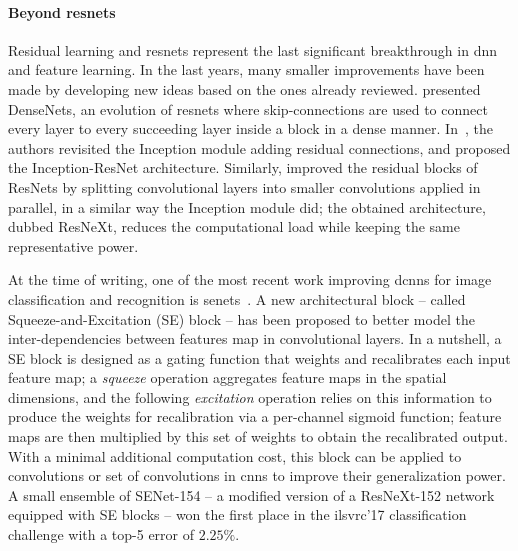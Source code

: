\paragraph{Beyond \glspl{resnet}}
Residual learning and \glspl{resnet} represent the last significant breakthrough in \gls{dnn} and feature learning.
In the last years, many smaller improvements have been made by developing new ideas based on the ones already reviewed.
\citet{huang2017densely} presented DenseNets, an evolution of \glspl{resnet} where skip-connections are used to connect every layer to every succeeding layer inside a block in a dense manner.
In~\cite{szegedy2017inception}, the authors revisited the Inception module adding residual connections, and proposed the Inception-ResNet architecture.
Similarly, \citet{xie2017aggregated} improved the residual blocks of \glspl{ResNet} by splitting convolutional layers into smaller convolutions applied in parallel, in a similar way the Inception module did;
the obtained architecture, dubbed ResNeXt, reduces the computational load while keeping the same representative power.

At the time of writing, one of the most recent work improving \glspl{dcnn} for image classification and recognition is \glspl{senet}~\cite{hu2017squeeze}.
A new architectural block -- called Squeeze-and-Excitation (SE) block -- has been proposed to better model the inter-dependencies between features map in convolutional layers.
In a nutshell, a SE block is designed as a gating function that weights and recalibrates each input feature map;
a \emph{squeeze} operation aggregates feature maps in the spatial dimensions, and the following \emph{excitation} operation relies on this information to produce the weights for recalibration via a per-channel sigmoid function;
feature maps are then multiplied by this set of weights to obtain the recalibrated output.
With a minimal additional computation cost, this block can be applied to convolutions or set of convolutions in \glspl{cnn} to improve their generalization power.
A small ensemble of SENet-154 -- a modified version of a ResNeXt-152 network~\cite{xie2017aggregated} equipped with SE blocks -- won the first place in the \gls{ilsvrc}'17 classification challenge with a top-5 error of $2.25 \%$.

